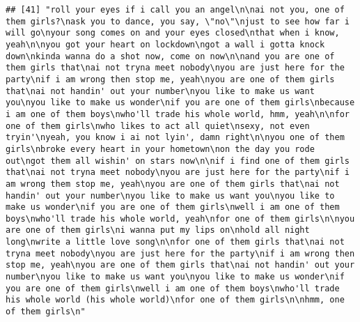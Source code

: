 \documentclass[]{article}
\begin{document}
\begin{verbatim}
## [41] "roll your eyes if i call you an angel\n\nai not you, one of them girls?\nask you to dance, you say, \"no\"\njust to see how far i will go\nyour song comes on and your eyes closed\nthat when i know, yeah\n\nyou got your heart on lockdown\ngot a wall i gotta knock down\nkinda wanna do a shot now, come on now\n\nand you are one of them girls that\nai not tryna meet nobody\nyou are just here for the party\nif i am wrong then stop me, yeah\nyou are one of them girls that\nai not handin' out your number\nyou like to make us want you\nyou like to make us wonder\nif you are one of them girls\nbecause i am one of them boys\nwho'll trade his whole world, hmm, yeah\n\nfor one of them girls\nwho likes to act all quiet\nsexy, not even tryin'\nyeah, you know i ai not lyin', damn right\n\nyou one of them girls\nbroke every heart in your hometown\non the day you rode out\ngot them all wishin' on stars now\n\nif i find one of them girls that\nai not tryna meet nobody\nyou are just here for the party\nif i am wrong them stop me, yeah\nyou are one of them girls that\nai not handin' out your number\nyou like to make us want you\nyou like to make us wonder\nif you are one of them girls\nwell i am one of them boys\nwho'll trade his whole world, yeah\nfor one of them girls\n\nyou are one of them girls\ni wanna put my lips on\nhold all night long\nwrite a little love song\n\nfor one of them girls that\nai not tryna meet nobody\nyou are just here for the party\nif i am wrong then stop me, yeah\nyou are one of them girls that\nai not handin' out your number\nyou like to make us want you\nyou like to make us wonder\nif you are one of them girls\nwell i am one of them boys\nwho'll trade his whole world (his whole world)\nfor one of them girls\n\nhmm, one of them girls\n"                                                                                                                                                                                                                                                                                                                                                                                                                                                                                                                                                                                                                                                                                                                                                                                                                                                                                                                                                                                                                                                                                                                                     

\end{verbatim}
\end{document}
